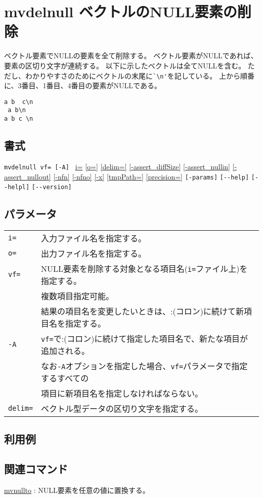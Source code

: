 
%

\section{mvdelnull ベクトルのNULL要素の削除\label{sect:mvdelnull}}
ベクトル要素でNULLの要素を全て削除する。
ベクトル要素がNULLであれば、要素の区切り文字が連続する。
以下に示したベクトルは全てNULLを含む。
ただし、わかりやすさのためにベクトルの末尾に\verb|`\n'|を記している。
上から順番に、3番目、1番目、4番目の要素がNULLである。
\begin{Verbatim}[baselinestretch=0.7,frame=single]
a b  c\n
 a b\n
a b c \n
\end{Verbatim}

\subsection*{書式}
\verb/mvdelnull vf= [-A] /
\hyperref[sect:option_i]{i=}
\hyperref[sect:option_o]{[o=]}
\hyperref[sect:option_delim]{[delim=]} 
\hyperref[sect:option_assert_diffSize]{[-assert\_diffSize]}
\hyperref[sect:option_assert_nullin]{[-assert\_nullin]}
\hyperref[sect:option_assert_nullout]{[-assert\_nullout]}
\hyperref[sect:option_nfn]{[-nfn]} 
\hyperref[sect:option_nfno]{[-nfno]}  
\hyperref[sect:option_x]{[-x]}
\hyperref[sect:option_option_tmppath]{[tmpPath=]}
\hyperref[sect:option_precision]{[precision=]}
\verb|[-params]|
\verb|[--help]|
\verb|[--helpl]|
\verb|[--version]|\\

\subsection*{パラメータ}
\begin{table}[htbp]
{\small
\begin{tabular}{ll}
\verb|i=|    & 入力ファイル名を指定する。\\
\verb|o=|    & 出力ファイル名を指定する。\\
\verb|vf=| & NULL要素を削除する対象となる項目名(\verb|i=|ファイル上)を指定する。\\
           & 複数項目指定可能。\\
		   & 結果の項目名を変更したいときは、:(コロン)に続けて新項目名を指定する。\\
\verb|-A|  & \verb|vf=|で:(コロン)に続けて指定した項目名で、新たな項目が追加される。\\
           & なお\verb|-A|オプションを指定した場合、\verb|vf=|パラメータで指定するすべての\\
           & 項目に新項目名を指定しなければならない。\\
\verb|delim=| & ベクトル型データの区切り文字を指定する。\\
\end{tabular}
}
\end{table} 

\subsection*{利用例}


\subsection*{関連コマンド}
\hyperref[sect:mvnullto]{mvnullto} : NULL要素を任意の値に置換する。

%
